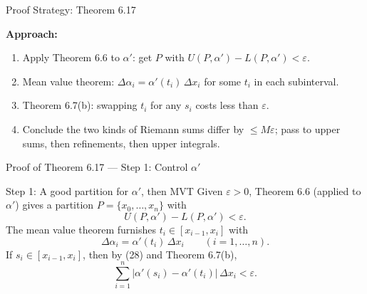 \documentclass[aspectratio=169,12pt,t]{beamer}
\begin{document}
{\begin{frame}{Proof Strategy: Theorem 6.17}
\begin{hlbox}
  \vspace{0.6em}
  \textbf{Approach:}
  \begin{enumerate}
    \item Apply Theorem 6.6 to $\alpha'$: get $P$ with
      $U(P,\alpha') - L(P,\alpha') < \varepsilon$.
    \item \alert{Mean value theorem}: $\Delta\alpha_i =
      \alpha'(t_i)\,\Delta x_i$ for some $t_i$ in each subinterval.
    \item Theorem 6.7(b): swapping $t_i$ for any $s_i$ costs less
      than $\varepsilon$.
    \item Conclude the two kinds of Riemann sums differ by
      $\leq M\varepsilon$; pass to upper sums, then refinements,
      then upper integrals.
  \end{enumerate}
  \end{hlbox}

\end{frame}

\begin{frame}{Proof of Theorem 6.17 --- Step 1: Control $\alpha'$}
  \begin{proofblock}{Step 1: A good partition for $\alpha'$, then MVT}
    \small
    Given $\varepsilon > 0$, Theorem 6.6 (applied to $\alpha'$) gives
    a partition $P = \{x_0, \dots, x_n\}$ with
    \begin{equation}
      U(P, \alpha') - L(P, \alpha') < \varepsilon. \tag{28}
    \end{equation}
    The \alert{mean value theorem} furnishes $t_i \in [x_{i-1}, x_i]$
    with
    \[
      \Delta\alpha_i = \alpha'(t_i)\,\Delta x_i \qquad (i = 1, \dots, n).
    \]
    If $s_i \in [x_{i-1}, x_i]$, then by (28) and Theorem 6.7(b),
    \begin{equation}
      \sum_{i=1}^{n} |\alpha'(s_i) - \alpha'(t_i)|\,\Delta x_i
      < \varepsilon. \tag{29}
    \end{equation}
  \end{proofblock}


\end{frame}}
\end{document}
